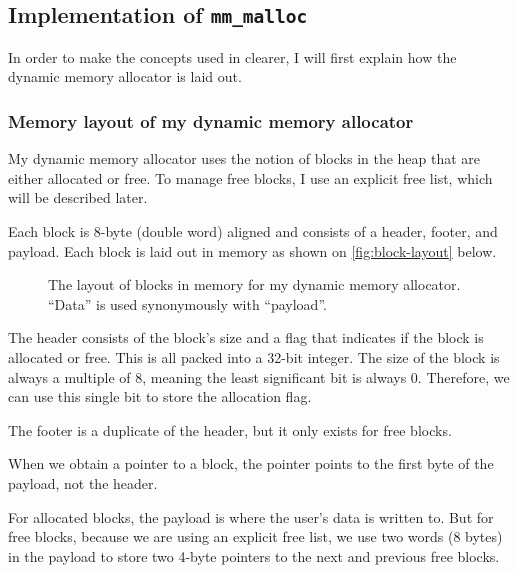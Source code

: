 \subsection{Implementation of \texttt{mm\_malloc}}

In order to make the concepts used in  clearer, I will first explain how the dynamic memory allocator is laid out.

\subsubsection{Memory layout of my dynamic memory allocator}

My dynamic memory allocator uses the notion of blocks in the heap that are either allocated or free. To manage free blocks, I use an explicit free list, which will be described later.

Each block is 8-byte (double word) aligned and consists of a header, footer, and payload. Each block is laid out in memory as shown on \autoref{fig:block-layout} below.

\begin{figure}[H]
  \centering
  \hbox{}
  \caption{The layout of blocks in memory for my dynamic memory allocator. ``Data'' is used synonymously with ``payload''.}
  \label{fig:block-layout}
\end{figure}

The header consists of the block's size and a flag that indicates if the block is allocated or free. This is all packed into a 32-bit integer. The size of the block is always a multiple of 8, meaning the least significant bit is always 0. Therefore, we can use this single bit to store the allocation flag.

The footer is a duplicate of the header, but it only exists for free blocks.

When we obtain a pointer to a block, the pointer points to the first byte of the payload, not the header.

For allocated blocks, the payload is where the user's data is written to. But for free blocks, because we are using an explicit free list, we use two words (8 bytes) in the payload to store two 4-byte pointers to the next and previous free blocks.

